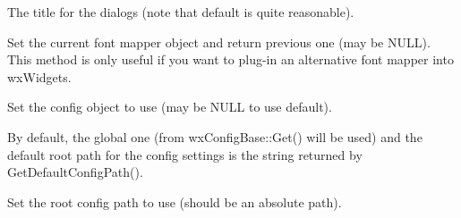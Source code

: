 
The title for the dialogs (note that default is quite reasonable).


\label{wxfontmapperset}


Set the current font mapper object and return previous one (may be NULL).
This method is only useful if you want to plug-in an alternative font mapper
into wxWidgets.




\label{wxfontmappersetconfig}


Set the config object to use (may be NULL to use default).

By default, the global one (from wxConfigBase::Get() will be used) 
and the default root path for the config settings is the string returned by
GetDefaultConfigPath().


\label{wxfontmappersetconfigpath}


Set the root config path to use (should be an absolute path).

